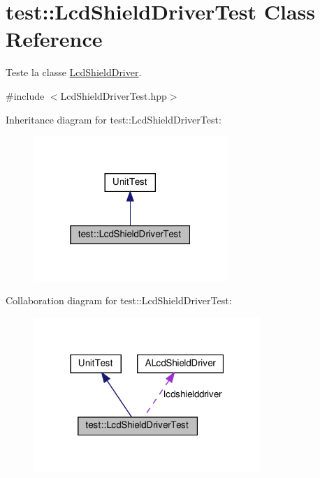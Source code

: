 \hypertarget{classtest_1_1LcdShieldDriverTest}{}\section{test\+:\+:Lcd\+Shield\+Driver\+Test Class Reference}
\label{classtest_1_1LcdShieldDriverTest}


Teste la classe \hyperlink{classLcdShieldDriver}{Lcd\+Shield\+Driver}.  




{\ttfamily \#include $<$Lcd\+Shield\+Driver\+Test.\+hpp$>$}



Inheritance diagram for test\+:\+:Lcd\+Shield\+Driver\+Test\+:
\nopagebreak
\begin{figure}[H]
\begin{center}
\leavevmode
\includegraphics[width=208pt]{classtest_1_1LcdShieldDriverTest__inherit__graph}
\end{center}
\end{figure}


Collaboration diagram for test\+:\+:Lcd\+Shield\+Driver\+Test\+:
\nopagebreak
\begin{figure}[H]
\begin{center}
\leavevmode
\includegraphics[width=244pt]{classtest_1_1LcdShieldDriverTest__coll__graph}
\end{center}
\end{figure}
